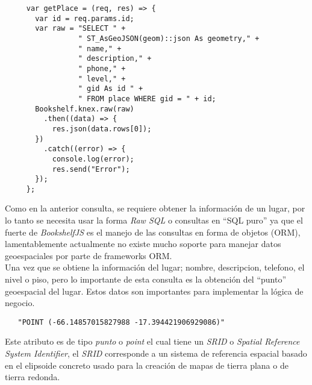  \begin{center}
   \begin{verbatim}
     var getPlace = (req, res) => {
       var id = req.params.id;
       var raw = "SELECT " +
                 " ST_AsGeoJSON(geom)::json As geometry," +
                 " name," +
                 " description," +
                 " phone," +
                 " level," +
                 " gid As id " +
                 " FROM place WHERE gid = " + id;
       Bookshelf.knex.raw(raw)
         .then((data) => {
           res.json(data.rows[0]);
       })
         .catch((error) => {
           console.log(error);
           res.send("Error");
       });
     };
   \end{verbatim}
 \end{center}

Como en la anterior consulta, se requiere obtener la información de un lugar, por lo tanto se necesita  usar la forma \emph{Raw SQL} o consultas en ``SQL puro'' ya que el fuerte de \emph{BookshelfJS} es el manejo de las consultas en forma de objetos (ORM), lamentablemente actualmente no existe mucho soporte para manejar datos geoespaciales por parte de frameworks ORM.\\

Una vez que se obtiene la información del lugar; nombre, descripcion, telefono, el nivel o piso, pero lo importante de esta consulta es la obtención del ``punto'' geoespacial del lugar. Estos datos son importantes para implementar la lógica de negocio.\\


\begin{center}
 \begin{verbatim}
   "POINT (-66.14857015827988 -17.394421906929086)"
 \end{verbatim}
\end{center}



Este atributo es de tipo \emph{punto} o \emph{point} el cual tiene un \emph{SRID} o \emph{Spatial Reference System Identifier}, el \emph{SRID} corresponde a un sistema de referencia espacial basado en el elipsoide concreto usado para la creación de mapas de tierra plana o de tierra redonda.\cite{msdn_srid}\\

